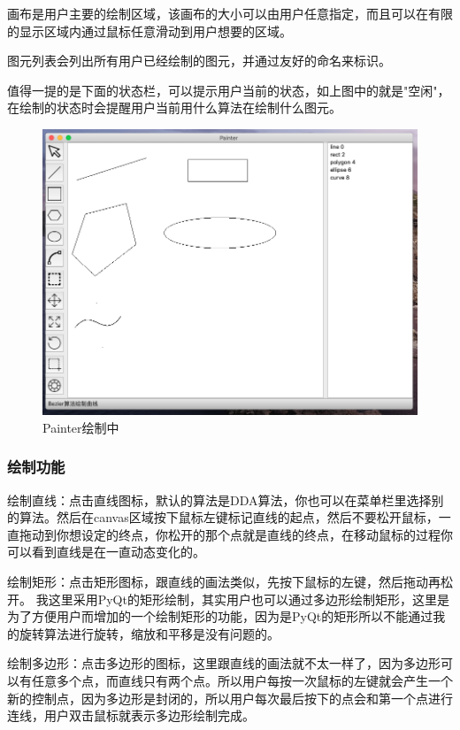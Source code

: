 \documentclass[a4paper,UTF8]{article}
\theoremstyle{definition}
\begin{document}
画布是用户主要的绘制区域，该画布的大小可以由用户任意指定，而且可以在有限的显示区域内通过鼠标任意滑动到用户想要的区域。

图元列表会列出所有用户已经绘制的图元，并通过友好的命名来标识。

值得一提的是下面的状态栏，可以提示用户当前的状态，如上图中的就是"空闲"，在绘制的状态时会提醒用户当前用什么算法在绘制什么图元。

\begin{figure}[H]
    \centering
    \includegraphics[scale=0.5]{Painting.png}
    \caption{Painter绘制中}
\end{figure}

\subsubsection{绘制功能}

绘制直线：点击直线图标，默认的算法是DDA算法，你也可以在菜单栏里选择别的算法。然后在canvas区域按下鼠标左键标记直线的起点，然后不要松开鼠标，一直拖动到你想设定的终点，你松开的那个点就是直线的终点，在移动鼠标的过程你可以看到直线是在一直动态变化的。

绘制矩形：点击矩形图标，跟直线的画法类似，先按下鼠标的左键，然后拖动再松开。 我这里采用PyQt的矩形绘制，其实用户也可以通过多边形绘制矩形，这里是为了方便用户而增加的一个绘制矩形的功能，因为是PyQt的矩形所以不能通过我的旋转算法进行旋转，缩放和平移是没有问题的。

绘制多边形：点击多边形的图标，这里跟直线的画法就不太一样了，因为多边形可以有任意多个点，而直线只有两个点。所以用户每按一次鼠标的左键就会产生一个新的控制点，因为多边形是封闭的，所以用户每次最后按下的点会和第一个点进行连线，用户双击鼠标就表示多边形绘制完成。
\end{document}
